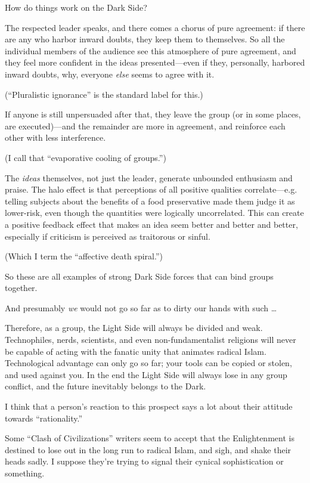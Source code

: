 {
 How do things work on the Dark Side?}

{
 The respected leader speaks, and there comes a chorus of pure
agreement: if there are any who harbor inward doubts, they keep them to
themselves. So all the individual members of the audience see this
atmosphere of pure agreement, and they feel more confident in the ideas
presented---even if they, personally, harbored inward doubts, why,
everyone \textit{else} seems to agree with it.}

{
 (``Pluralistic ignorance'' is
the standard label for this.)}

{
 If anyone is still unpersuaded after that, they leave the group
(or in some places, are executed)---and the remainder are more in
agreement, and reinforce each other with less interference.}

{
 (I call that ``evaporative cooling of
groups.'')}

{
 The \textit{ideas} themselves, not just the leader, generate
unbounded enthusiasm and praise. The halo effect is that perceptions of
all positive qualities correlate---e.g. telling subjects about the
benefits of a food preservative made them judge it as lower-risk, even
though the quantities were logically uncorrelated. This can create a
positive feedback effect that makes an idea seem better and better and
better, especially if criticism is perceived as traitorous or sinful.}

{
 (Which I term the ``affective death
spiral.'')}

{
 So these are all examples of strong Dark Side forces that can bind
groups together.}

{
 And presumably \textit{we} would not go so far as to dirty our
hands with such \ldots}

{
 Therefore, as a group, the Light Side will always be divided and
weak. Technophiles, nerds, scientists, and even non-fundamentalist
religions will never be capable of acting with the fanatic unity that
animates radical Islam. Technological advantage can only go so far;
your tools can be copied or stolen, and used against you. In the end
the Light Side will always lose in any group conflict, and the future
inevitably belongs to the Dark.}

{
 I think that a person's reaction to this prospect
says a lot about their attitude towards
``rationality.''}

{
 Some ``Clash of Civilizations''
writers seem to accept that the Enlightenment is destined to lose out
in the long run to radical Islam, and sigh, and shake their heads
sadly. I suppose they're trying to signal their cynical
sophistication or something.}

